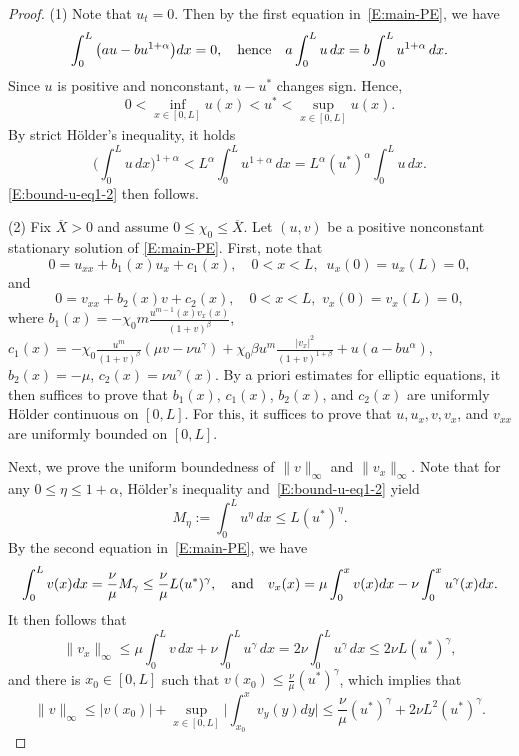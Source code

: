 \documentclass[11pt]{article} %
\theoremstyle{remark}
\theoremstyle{remark}
\numberwithin{equation}{section}
\numberwithin{figure}{section}
\numberwithin{table}{section}
\begin{document}
\begin{proof}
  (1) Note that $u_t = 0$. Then by the first equation in~\eqref{E:main-PE}, we
  have
  \begin{equation}\label{E:mass-identity}
    \int_{0}^L \big(a u-b u^{{1}+{\alpha}}\big)dx=0,\quad {\rm hence}\quad  a\int_0^L u\,dx=b\int_0^L u^{1+\alpha}\,dx.
  \end{equation}
  Since $u$ is positive and nonconstant, $u - u^*$ changes sign. Hence,
  \[
    0<\inf_{x\in[0,L]}u(x)<u^*<\sup_{x\in [0,L]}u(x).
  \]
  By strict H\"older's inequality, it holds
  \[
    \Big(\int_0^L u\,dx\Big)^{1+\alpha}
    <
    L^\alpha\int_0^L u^{1+\alpha}\,dx
    =L^\alpha(u^*)^\alpha\int_0^L u\,dx.
  \]
  \eqref{E:bound-u-eq1-2} then follows.

  \smallskip

  (2) Fix $\overline{X} > 0$ and assume $0 \le \chi_0 \le \overline{X}$. Let
  $(u,v)$ be a positive nonconstant stationary solution of \eqref{E:main-PE}.
  First, note that
  \begin{equation}\label{E:elliptic-u-eq}
    0=u_{xx}+b_1(x) u_x+c_1(x),\quad 0<x<L,\,\,\, u_x(0)=u_x(L)=0,
  \end{equation}
  and
  \begin{equation}\label{E:elliptic-v-eq}
    0=v_{xx}+b_2(x)v+c_2(x),\quad 0<x<L,\,\, v_x(0)=v_x(L)=0,
  \end{equation}
  where $b_1(x) = -\chi_0 m \frac{u^{m-1}(x) v_x(x)}{(1+v)^\beta}$, $c_1(x) =
  -\chi_0 \frac{u^m}{(1+v)^\beta} (\mu v-\nu u^\gamma) +\chi_0 \beta
  u^m\frac{|v_x|^2}{(1+v)^{1+\beta}}+u(a-bu^\alpha)$, $b_2(x) = -\mu$, $c_2(x) =
  \nu u^\gamma(x)$. By a priori estimates for elliptic equations, it then
  suffices to prove that $b_1(x)$, $c_1(x)$, $b_2(x)$, and $c_2(x)$ are
  uniformly H\"older continuous on $[0,L]$. For this, it suffices to prove that
  $u, u_x, v, v_x$, and $v_{xx}$ are uniformly bounded on $[0,L]$.

  Next, we prove the uniform boundedness of $\|v\|_\infty$ and $\|v_x\|_\infty$.
  Note that for any $0 \le \eta \le 1+\alpha$, H\"older's inequality
  and~\eqref{E:bound-u-eq1-2} yield
  \begin{equation}\label{E:M-eta}
    M_\eta:=\int_0^L u^\eta\,dx\le L\left(u^*\right)^\eta.
  \end{equation}
  By the second equation in~\eqref{E:main-PE}, we have
  \[
    \int_0^L v(x)dx=\frac{\nu}{\mu}M_\gamma \le \frac{\nu}{\mu} L (u^*)^\gamma,
    \quad {\rm and}\quad
    v_x(x)=\mu\int_0^x v(x)dx-\nu\int_0^x u^\gamma(x)dx.
  \]
  It then follows that
  \begin{equation}\label{E:vx-sup}
    \|v_x\|_\infty
    \le\mu\int_0^L v\,dx+\nu\int_0^L u^\gamma\,dx
    =2\nu\int_0^L u^\gamma\,dx\le2\nu L\left(u^*\right)^\gamma,
  \end{equation}
  and there is $x_0 \in [0,L]$ such that $v(x_0) \le \frac{\nu}{\mu}
  (u^*)^\gamma$, which implies that
  \begin{equation}\label{E:v-infty-eq}
    \|v\|_\infty \le |v(x_0)|+\sup_{x\in [0,L]}\Big|\int_{x_0}^ x v_y(y)dy\Big|\le \frac{\nu}{\mu}(u^*)^\gamma +2\nu L^2\left(u^*\right)^\gamma.
  \end{equation}


\end{proof}
\end{document}
